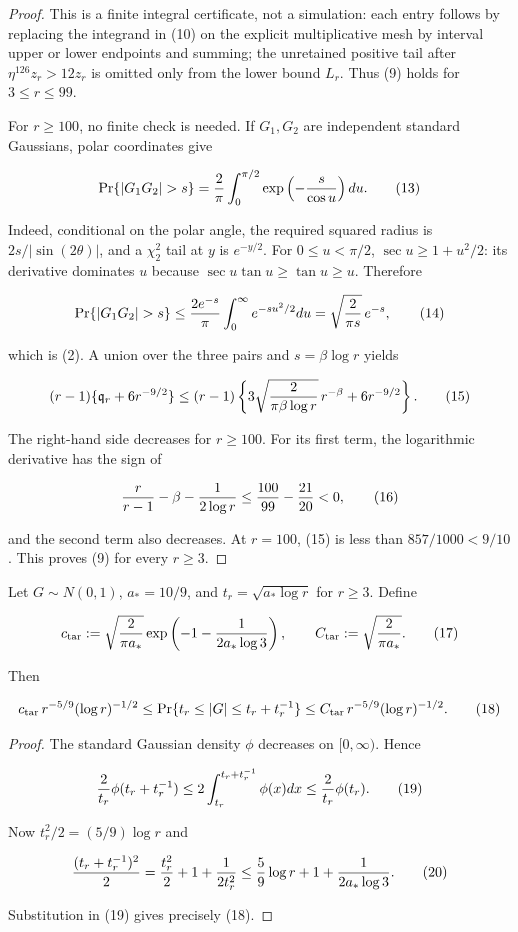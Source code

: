 \begin{lemma}
\begin{proof}
This is a finite integral certificate, not a simulation: each entry follows
by replacing the integrand in (10) on the explicit multiplicative mesh by
interval upper or lower endpoints and summing; the unretained positive tail after
$\eta^{126}z_r>12z_r$ is omitted only from the lower bound $L_r$.
Thus (9) holds for $3\le r\le99$.

For $r\ge100$, no finite check is needed. If $G_1,G_2$ are independent
standard Gaussians, polar coordinates give

\[
\Pr\{|G_1G_2|>s\}
={2\over\pi}\int_0^{\pi/2}
 \exp\left(-{s\over\cos u}\right)du.
\tag{13}
\]

Indeed, conditional on the polar angle, the required squared radius is
$2s/|\sin(2\theta)|$, and a $\chi^2_2$ tail at $y$ is $e^{-y/2}$.
For $0\le u<\pi/2$, $\sec u\ge1+u^2/2$: its derivative dominates $u$
because $\sec u\tan u\ge\tan u\ge u$. Therefore

\[
\Pr\{|G_1G_2|>s\}
\le {2e^{-s}\over\pi}\int_0^\infty e^{-su^2/2}du
=\sqrt{2\over\pi s}\,e^{-s},
\tag{14}
\]

which is (2). A union over the three pairs and $s=\beta\log r$ yields

\[
(r-1)\{\mathfrak q_r+6r^{-9/2}\}
\le(r-1)\left\{
3\sqrt{2\over\pi\beta\log r}\,r^{-\beta}
+6r^{-9/2}\right\}.
\tag{15}
\]

The right-hand side decreases for $r\ge100$. For its first term, the
logarithmic derivative has the sign of

\[
{r\over r-1}-\beta-{1\over2\log r}
\le {100\over99}-{21\over20}<0,
\tag{16}
\]

and the second term also decreases. At $r=100$, (15) is less than
$857/1000<9/10$. This proves (9) for every $r\ge3$. 


\end{proof}
\end{lemma}
\begin{lemma}\label{lem:step-002-target-mass}
Let $G\sim N(0,1)$, $a_*=10/9$, and
$t_r=\sqrt{a_*\log r}$ for $r\ge3$. Define

\[
c_{\rm tar}:=\sqrt{2\over\pi a_*}
 \exp\left(-1-{1\over2a_*\log3}\right),
\qquad
C_{\rm tar}:=\sqrt{2\over\pi a_*}.
\tag{17}
\]

Then

\[
c_{\rm tar}\,r^{-5/9}(\log r)^{-1/2}
\le
\Pr\{t_r\le|G|\le t_r+t_r^{-1}\}
\le
C_{\rm tar}\,r^{-5/9}(\log r)^{-1/2}.
\tag{18}
\]

\begin{proof}
The standard Gaussian density $\phi$ decreases on $[0,\infty)$. Hence

\[
{2\over t_r}\phi(t_r+t_r^{-1})
\le2\int_{t_r}^{t_r+t_r^{-1}}\phi(x)dx
\le {2\over t_r}\phi(t_r).
\tag{19}
\]

Now $t_r^2/2=(5/9)\log r$ and

\[
{(t_r+t_r^{-1})^2\over2}
={t_r^2\over2}+1+{1\over2t_r^2}
\le {5\over9}\log r+1+{1\over2a_*\log3}.
\tag{20}
\]

Substitution in (19) gives precisely (18). 

\end{proof}
\end{lemma}
